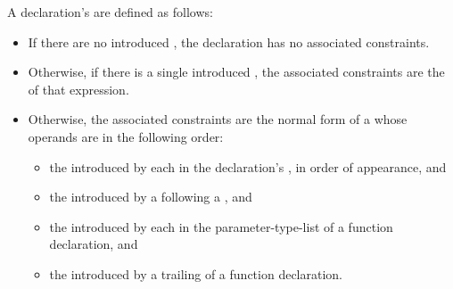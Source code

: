 \pnum
{}%
A declaration's  are defined as follows:
\begin{itemize}
\item If there are no introduced ,
the declaration has no associated constraints.

\item Otherwise, if there is a single introduced ,
the associated constraints are the 
of that expression.

\item Otherwise, the associated constraints are the normal form of a  whose operands are in the
following order:
\begin{itemize}
\item
the  introduced by
each  in
the declaration's ,
in order of appearance, and

\item
the  introduced by
a  following
a , and

\item
the  introduced by
each  in
the parameter-type-list of a function declaration, and

\item
the  introduced by
a trailing  of
a function declaration.
\end{itemize}
\end{itemize}

